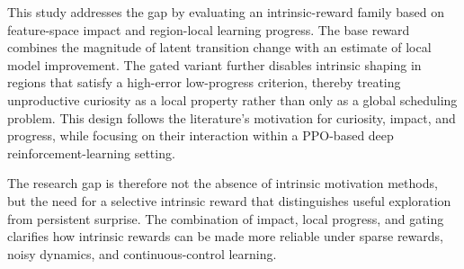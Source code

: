 This study addresses the gap by evaluating an intrinsic-reward family based on feature-space impact and region-local learning progress.
The base reward combines the magnitude of latent transition change with an estimate of local model improvement.
The gated variant further disables intrinsic shaping in regions that satisfy a high-error low-progress criterion, thereby treating unproductive curiosity as a local property rather than only as a global scheduling problem.
This design follows the literature's motivation for curiosity, impact, and progress, while focusing on their interaction within a PPO-based deep reinforcement-learning setting.

The research gap is therefore not the absence of intrinsic motivation methods, but the need for a selective intrinsic reward that distinguishes useful exploration from persistent surprise.
The combination of impact, local progress, and gating clarifies how intrinsic rewards can be made more reliable under sparse rewards, noisy dynamics, and continuous-control learning.